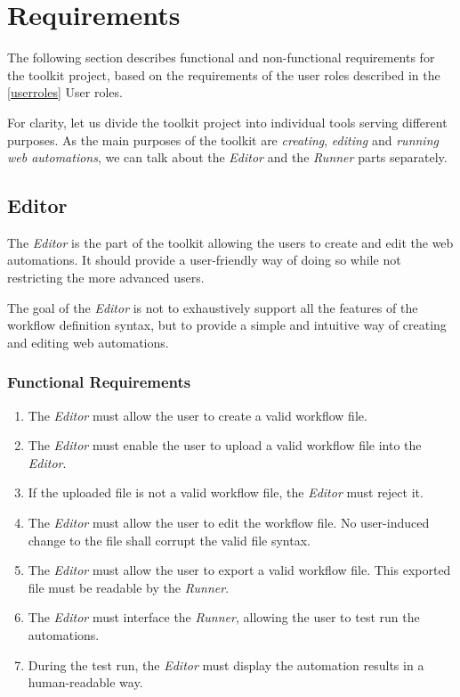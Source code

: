 
\section{Requirements}
\label{requirements}

The following section describes functional and non-functional requirements for the toolkit project, 
based on the requirements of the user roles described in the \autoref{userroles} User roles.

For clarity, let us divide the toolkit project into individual tools serving different purposes.
As the main purposes of the toolkit are \textit{creating}, \textit{editing} and \textit{running web automations},
we can talk about the \textit{Editor} and the \textit{Runner} parts separately.

\emptyline
\subsection{Editor}

The \textit{Editor} is the part of the toolkit allowing the users to create and edit the web automations.
It should provide a user-friendly way of doing so while not restricting the more advanced users.

The goal of the \textit{Editor} is not to exhaustively support all the features of the workflow definition syntax, but to provide a simple and intuitive way of creating and editing web automations.

\smallskip

\subsubsection{Functional Requirements}

\begin{enumerate}[label=\thesubsection.1.\arabic*]
    \item The \textit{Editor} must allow the user to create a valid workflow file.
    \item The \textit{Editor} must enable the user to upload a valid workflow file into the \textit{Editor}.
    \item If the uploaded file is not a valid workflow file, the \textit{Editor} must reject it.
    \item The \textit{Editor} must allow the user to edit the workflow file. 
    No user-induced change to the file shall corrupt the valid file syntax.
    \item The \textit{Editor} must allow the user to export a valid workflow file. 
    This exported file must be readable by the \textit{Runner}.
    \item The \textit{Editor} must interface the \textit{Runner}, allowing the user to test run the automations.
    \item During the test run, the \textit{Editor} must display the automation results in a human-readable way.
\end{enumerate}

